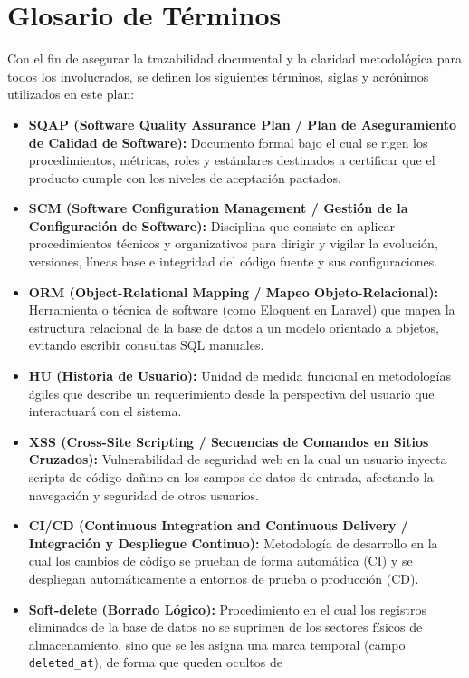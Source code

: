 \section{Glosario de Términos}
Con el fin de asegurar la trazabilidad documental y la claridad metodológica para todos los involucrados, se definen los siguientes términos, siglas y acrónimos utilizados en este plan:
\begin{itemize}
\item
  \textbf{SQAP (Software Quality Assurance Plan / Plan de Aseguramiento
  de Calidad de Software):} Documento formal bajo el cual se rigen los
  procedimientos, métricas, roles y estándares destinados a certificar
  que el producto cumple con los niveles de aceptación pactados.
\item
  \textbf{SCM (Software Configuration Management / Gestión de la
  Configuración de Software):} Disciplina que consiste en aplicar
  procedimientos técnicos y organizativos para dirigir y vigilar la
  evolución, versiones, líneas base e integridad del código fuente y sus
  configuraciones.
\item
  \textbf{ORM (Object-Relational Mapping / Mapeo Objeto-Relacional):}
  Herramienta o técnica de software (como Eloquent en Laravel) que mapea
  la estructura relacional de la base de datos a un modelo orientado a
  objetos, evitando escribir consultas SQL manuales.
\item
  \textbf{HU (Historia de Usuario):} Unidad de medida funcional en
  metodologías ágiles que describe un requerimiento desde la perspectiva
  del usuario que interactuará con el sistema.
\item
  \textbf{XSS (Cross-Site Scripting / Secuencias de Comandos en Sitios
  Cruzados):} Vulnerabilidad de seguridad web en la cual un usuario
  inyecta scripts de código dañino en los campos de datos de entrada,
  afectando la navegación y seguridad de otros usuarios.
\item
  \textbf{CI/CD (Continuous Integration and Continuous Delivery /
  Integración y Despliegue Continuo):} Metodología de desarrollo en la
  cual los cambios de código se prueban de forma automática (CI) y se
  despliegan automáticamente a entornos de prueba o producción (CD).
\item
  \textbf{Soft-delete (Borrado Lógico):} Procedimiento en el cual los
  registros eliminados de la base de datos no se suprimen de los
  sectores físicos de almacenamiento, sino que se les asigna una marca
  temporal (campo \texttt{deleted\_at}), de forma que queden ocultos de

\end{itemize}
